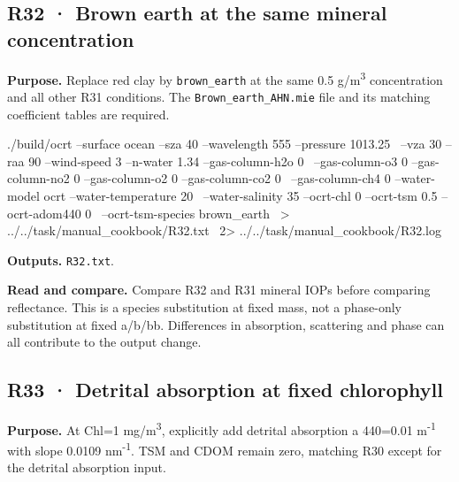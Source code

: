 
\subsection{R32 · Brown earth at the same mineral concentration}
\label{sec:auto:09_cookbook:6.7}

\label{recipe:R32}

\textbf{Purpose. }Replace red clay by \texttt{brown\_\allowbreak{}earth} at the same 0.5 g/m\textsuperscript{3} concentration and all other R31 conditions. The \texttt{Brown\_\allowbreak{}earth\_\allowbreak{}AHN.mie} file and its matching coefficient tables are required.

\noindent\begin{minipage}{\linewidth}
\begin{ManualCode}

./build/ocrt --surface ocean --sza 40 --wavelength 555 --pressure 1013.25 \
  --vza 30 --raa 90 --wind-speed 3 --n-water 1.34 --gas-column-h2o 0 \
  --gas-column-o3 0 --gas-column-no2 0 --gas-column-o2 0 --gas-column-co2 0 \
  --gas-column-ch4 0 --water-model ocrt --water-temperature 20 \
  --water-salinity 35 --ocrt-chl 0 --ocrt-tsm 0.5 --ocrt-adom440 0 \
  --ocrt-tsm-species brown_earth \
  > ../../task/manual_cookbook/R32.txt \
  2> ../../task/manual_cookbook/R32.log

\end{ManualCode}
\end{minipage}\par

\textbf{Outputs. }\texttt{R32.txt}.

\textbf{Read and compare. }Compare R32 and R31 mineral IOPs before comparing reflectance. This is a species substitution at fixed mass, not a phase-only substitution at fixed a/b/bb. Differences in absorption, scattering and phase can all contribute to the output change.


\subsection{R33 · Detrital absorption at fixed chlorophyll}
\label{sec:auto:09_cookbook:6.8}

\label{recipe:R33}

\textbf{Purpose. }At Chl=1 mg/m\textsuperscript{3}, explicitly add detrital absorption a 440=0.01 m\textsuperscript{-1} with slope 0.0109 nm\textsuperscript{-1}. TSM and CDOM remain zero, matching R30 except for the detrital absorption input.

